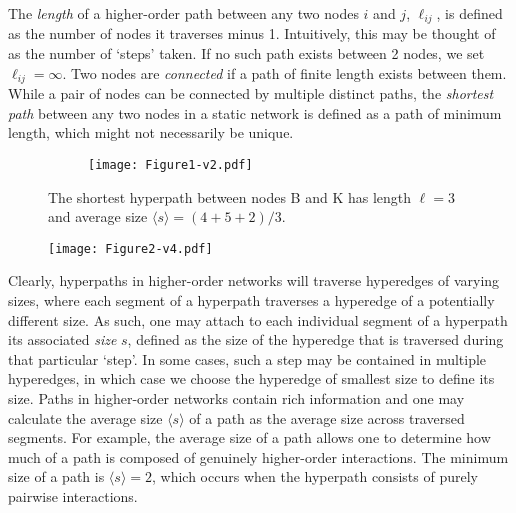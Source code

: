 \documentclass[a4paper,pre,reqno,superscriptaddress, twocolumn, floatfix]{revtex4}
\def\ho{higher-order }
\begin{document}
The \textit{length} of a \ho path between any two nodes $i$ and $j$, $\ell_{ij}$, is defined as the number of nodes it traverses minus 1. Intuitively, this may be thought of as the number of `steps' taken.
If no such path exists between 2 nodes, we set $\ell_{ij}=\infty$. Two nodes are \textit{connected} if a path of finite length exists between them. 
While a pair of nodes can be connected by multiple distinct paths, the \textit{shortest path} between any two nodes in a static network is defined as a path of minimum length, which might not necessarily be unique. 
 
\begin{figure}[hb]
    \begin{subfigure}{\linewidth}
        \texttt{[image: Figure1-v2.pdf]}
    \end{subfigure}%
    \caption{\justifying 
    The shortest hyperpath between nodes B and K has length $\ell=3$ and average size $\langle{s}\rangle=(4+5+2)/3$.
    }
    \label{fig:1}
\end{figure}


\begin{figure*}[ht]
    \begin{subfigure}{\textwidth}
        \texttt{[image: Figure2-v4.pdf]}
    \end{subfigure}%
    \caption{ \justifying 
    Shortest paths in the static hypergraph of the Copenhagen study.
    Path-length distributions of \ho and purely dyadic paths for hypergraphs of the Copenhagen dataset for (a) the empirical data and (b) a randomised null-model. 
    (c) Average interaction size $\langle{s}\rangle$ of the \ho path as a function of the path length for empirical (blue) and randomised (dark red) data.
    (d) Average fraction of each path which is purely dyadic as a function of the path length for empirical (grey) and randomised (light red) data.  
    Shaded areas represent a 97.5\% confidence interval obtained over 100 randomisations.}
    \label{fig:2}
\end{figure*}

Clearly, hyperpaths in \ho networks will traverse hyperedges of varying sizes, where each segment of a hyperpath traverses a hyperedge of a potentially different size. As such, one may attach to each individual segment of a hyperpath its associated \textit{size} $s$, defined as the size of the hyperedge that is traversed during that particular `step'. In some cases, such a step may be contained in multiple hyperedges, in which case we choose the hyperedge of smallest size to define its size.
Paths in \ho networks contain rich information and one may calculate the average size $\langle{s}\rangle$ of a path as the average size across traversed segments. For example, the average size of a path allows one to determine how much of a path is composed of genuinely \ho interactions. The minimum size of a path is $\langle{s}\rangle=2$, which occurs when the hyperpath consists of purely pairwise interactions. 
\end{document}
